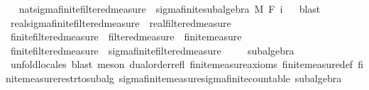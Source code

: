 \begin{isabellebody}
\ %
\endisadelimproof
%
\isatagproof
\isacommand{{\isachardot}{\kern0pt}{\isachardot}{\kern0pt}}\isamarkupfalse%
%
\endisatagproof
{\isafoldproof}%
%
\isadelimproof
%
\endisadelimproof
\isanewline
{}\isamarkupfalse%
\ nat{\isacharunderscore}{\kern0pt}sigma{\isacharunderscore}{\kern0pt}finite{\isacharunderscore}{\kern0pt}filtered{\isacharunderscore}{\kern0pt}measure\ {\isasymsubseteq}\ sigma{\isacharunderscore}{\kern0pt}finite{\isacharunderscore}{\kern0pt}subalgebra\ M\ {\isachardoublequoteopen}F\ i{\isachardoublequoteclose}%
\isadelimproof
\ %
\endisadelimproof
%
\isatagproof
{}\isamarkupfalse%
\ blast%
\endisatagproof
{\isafoldproof}%
%
\isadelimproof
%
\endisadelimproof
\isanewline
\isanewline
{}\isamarkupfalse%
\ real{\isacharunderscore}{\kern0pt}sigma{\isacharunderscore}{\kern0pt}finite{\isacharunderscore}{\kern0pt}filtered{\isacharunderscore}{\kern0pt}measure\ {\isasymsubseteq}\ real{\isacharunderscore}{\kern0pt}filtered{\isacharunderscore}{\kern0pt}measure%
\isadelimproof
\ %
\endisadelimproof
%
\isatagproof
\isacommand{{\isachardot}{\kern0pt}{\isachardot}{\kern0pt}}\isamarkupfalse%
%
\endisatagproof
{\isafoldproof}%
%
\isadelimproof
%
\endisadelimproof
%
\isadelimdocument
%
\endisadelimdocument
%
\isatagdocument
%
\isamarkuptrue%
%
\endisatagdocument
{\isafolddocument}%
%
\isadelimdocument
%
\endisadelimdocument
{}\isamarkupfalse%
\ finite{\isacharunderscore}{\kern0pt}filtered{\isacharunderscore}{\kern0pt}measure\ {\isacharequal}{\kern0pt}\ filtered{\isacharunderscore}{\kern0pt}measure\ {\isacharplus}{\kern0pt}\ finite{\isacharunderscore}{\kern0pt}measure\isanewline
\isanewline
{}\isamarkupfalse%
\ finite{\isacharunderscore}{\kern0pt}filtered{\isacharunderscore}{\kern0pt}measure\ {\isasymsubseteq}\ sigma{\isacharunderscore}{\kern0pt}finite{\isacharunderscore}{\kern0pt}filtered{\isacharunderscore}{\kern0pt}measure\ \isanewline
%
\isadelimproof
\ \ %
\endisadelimproof
%
\isatagproof
{}\isamarkupfalse%
\ subalgebra\ \isamarkupfalse%
\ {\isacharparenleft}{\kern0pt}unfold{\isacharunderscore}{\kern0pt}locales{\isacharcomma}{\kern0pt}\ blast{\isacharcomma}{\kern0pt}\ meson\ dual{\isacharunderscore}{\kern0pt}order{\isachardot}{\kern0pt}refl\ finite{\isacharunderscore}{\kern0pt}measure{\isacharunderscore}{\kern0pt}axioms\ finite{\isacharunderscore}{\kern0pt}measure{\isacharunderscore}{\kern0pt}def\ finite{\isacharunderscore}{\kern0pt}measure{\isacharunderscore}{\kern0pt}restr{\isacharunderscore}{\kern0pt}to{\isacharunderscore}{\kern0pt}subalg\ sigma{\isacharunderscore}{\kern0pt}finite{\isacharunderscore}{\kern0pt}measure{\isachardot}{\kern0pt}sigma{\isacharunderscore}{\kern0pt}finite{\isacharunderscore}{\kern0pt}countable\ subalgebra{\isacharparenright}{\kern0pt}%

\end{isabellebody}
